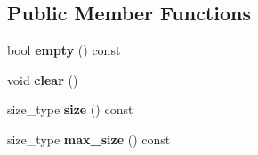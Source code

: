 \subsection*{Public Member Functions}
\begin{DoxyCompactItemize}
\item 
bool {\bfseries empty} () const \hypertarget{classds_1_1tree__base_a35c2c9196cfef1a95cf0d1795ea9f730}{}\label{classds_1_1tree__base_a35c2c9196cfef1a95cf0d1795ea9f730}

\item 
void {\bfseries clear} ()\hypertarget{classds_1_1tree__base_a1b80d41673c08773cd94012b399b0796}{}\label{classds_1_1tree__base_a1b80d41673c08773cd94012b399b0796}

\item 
size\+\_\+type {\bfseries size} () const \hypertarget{classds_1_1tree__base_a9ec4df9231bfa76c3c38db425e0e545e}{}\label{classds_1_1tree__base_a9ec4df9231bfa76c3c38db425e0e545e}

\item 
size\+\_\+type {\bfseries max\+\_\+size} () const \hypertarget{classds_1_1tree__base_a807513fa3b0b4a8039f12fff948f20fc}{}\label{classds_1_1tree__base_a807513fa3b0b4a8039f12fff948f20fc}

\end{DoxyCompactItemize}

